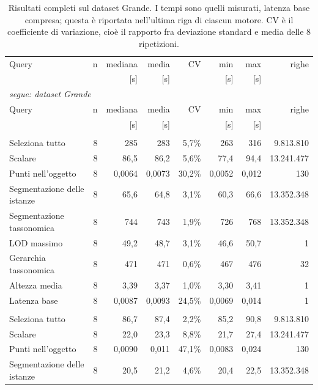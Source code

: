 \begin{small}
\begin{longtable}{lrrrrrr r}
\caption{Risultati completi sul dataset Grande. I tempi sono quelli misurati, latenza base compresa; questa è riportata nell'ultima riga di ciascun motore. CV è il coefficiente di variazione, cioè il rapporto fra deviazione standard e media delle 8 ripetizioni.}\label{tab:raw_grande}\\
\toprule
Query & n & mediana & media & CV & min & max & righe \\
 & & [s] & [s] & & [s] & [s] & \\
\midrule
\endfirsthead
\multicolumn{8}{l}{\small\itshape segue: dataset Grande}\\
\toprule
Query & n & mediana & media & CV & min & max & righe \\
 & & [s] & [s] & & [s] & [s] & \\
\midrule
\endhead
\endfoot
\bottomrule
\endlastfoot
\multicolumn{8}{l}{\textbf{Fuseki}}\\
\quad Seleziona tutto & 8 & 285 & 283 & 5,7\% & 263 & 316 & 9.813.810 \\
\quad Scalare & 8 & 86,5 & 86,2 & 5,6\% & 77,4 & 94,4 & 13.241.477 \\
\quad Punti nell'oggetto & 8 & 0,0064 & 0,0073 & 30,2\% & 0,0052 & 0,012 & 130 \\
\quad Segmentazione delle istanze & 8 & 65,6 & 64,8 & 3,1\% & 60,3 & 66,6 & 13.352.348 \\
\quad Segmentazione tassonomica & 8 & 744 & 743 & 1,9\% & 726 & 768 & 13.352.348 \\
\quad LOD massimo & 8 & 49,2 & 48,7 & 3,1\% & 46,6 & 50,7 & 1 \\
\quad Gerarchia tassonomica & 8 & 471 & 471 & 0,6\% & 467 & 476 & 32 \\
\quad Altezza media & 8 & 3,39 & 3,37 & 1,0\% & 3,30 & 3,41 & 1 \\
\quad Latenza base & 8 & 0,0087 & 0,0093 & 24,5\% & 0,0069 & 0,014 & 1 \\
\addlinespace
\multicolumn{8}{l}{\textbf{GraphDB}}\\
\quad Seleziona tutto & 8 & 86,7 & 87,4 & 2,2\% & 85,2 & 90,8 & 9.813.810 \\
\quad Scalare & 8 & 22,0 & 23,3 & 8,8\% & 21,7 & 27,4 & 13.241.477 \\
\quad Punti nell'oggetto & 8 & 0,0090 & 0,011 & 47,1\% & 0,0083 & 0,024 & 130 \\
\quad Segmentazione delle istanze & 8 & 20,5 & 21,2 & 4,6\% & 20,4 & 22,5 & 13.352.348 \\

\end{longtable}
\end{small}
